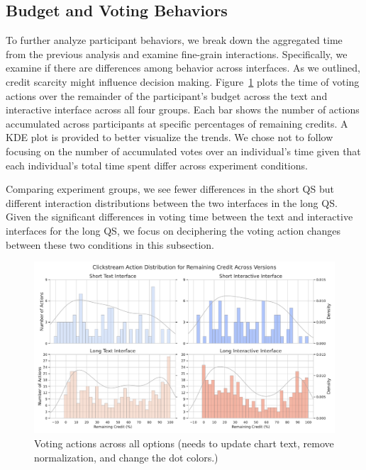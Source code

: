 \subsection{Budget and Voting Behaviors}
To further analyze participant behaviors, we break down the aggregated time from the previous analysis and examine fine-grain interactions. Specifically, we examine if there are differences among behavior across interfaces. As we outlined, credit scarcity might influence decision making.  Figure~\ref{fig:voting_all} plots the time of voting actions over the remainder of the participant's budget across the text and interactive interface across all four groups. Each bar shows the number of actions accumulated across participants at specific percentages of remaining credits. A KDE plot is provided to better visualize the trends. We chose not to follow ~\textcite{quarfoot2017quadratic} focusing on the number of accumulated votes over an individual's time given that each individual's total time spent differ across experiment conditions.

Comparing experiment groups, we see fewer differences in the short QS but different interaction distributions between the two interfaces in the long QS. Given the significant differences in voting time between the text and interactive interfaces for the long QS, we focus on deciphering the voting action changes between these two conditions in this subsection.

\begin{figure}[ht]
    \centering
    \includegraphics[width=\textwidth]{content/image/results/clickstream_action_distribution.pdf}
    \caption{Voting actions across all options (needs to update chart text, remove normalization, and change the dot colors.)}
    \label{fig:voting_all}
\end{figure}

